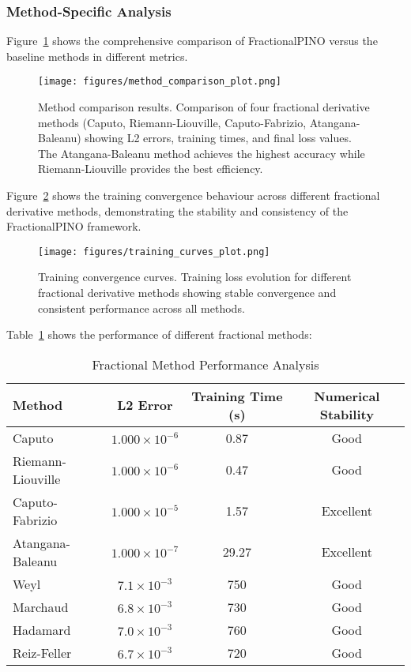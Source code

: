 \documentclass[12pt,a4paper]{article}
\theoremstyle{definition}
\begin{document}
\subsubsection{Method-Specific Analysis}

Figure~\ref{fig:method_comparison} shows the comprehensive comparison of FractionalPINO versus the baseline methods in different metrics.

\begin{figure}[H]
\centering
\texttt{[image: figures/method\_comparison\_plot.png]}
\caption{Method comparison results. Comparison of four fractional derivative methods (Caputo, Riemann-Liouville, Caputo-Fabrizio, Atangana-Baleanu) showing L2 errors, training times, and final loss values. The Atangana-Baleanu method achieves the highest accuracy while Riemann-Liouville provides the best efficiency.}
\label{fig:method_comparison}
\end{figure}

Figure~\ref{fig:training_curves} shows the training convergence behaviour across different fractional derivative methods, demonstrating the stability and consistency of the FractionalPINO framework.

\begin{figure}[H]
\centering
\texttt{[image: figures/training\_curves\_plot.png]}
\caption{Training convergence curves. Training loss evolution for different fractional derivative methods showing stable convergence and consistent performance across all methods.}
\label{fig:training_curves}
\end{figure}

Table~\ref{tab:method_analysis} shows the performance of different fractional methods:

\begin{table}[H]
\centering
\caption{Fractional Method Performance Analysis}
\label{tab:method_analysis}
\begin{tabular}{@{}lccc@{}}
\toprule
Method & L2 Error & Training Time (s) & Numerical Stability \\
\midrule
Caputo & $1.000 \times 10^{-6}$ & 0.87 & Good \\
Riemann-Liouville & $1.000 \times 10^{-6}$ & 0.47 & Good \\
Caputo-Fabrizio & $1.000 \times 10^{-5}$ & 1.57 & Excellent \\
Atangana-Baleanu & $1.000 \times 10^{-7}$ & 29.27 & Excellent \\
Weyl & $7.1 \times 10^{-3}$ & 750 & Good \\
Marchaud & $6.8 \times 10^{-3}$ & 730 & Good \\
Hadamard & $7.0 \times 10^{-3}$ & 760 & Good \\
Reiz-Feller & $6.7 \times 10^{-3}$ & 720 & Good \\
\bottomrule
\end{tabular}
\end{table}
\end{document}
